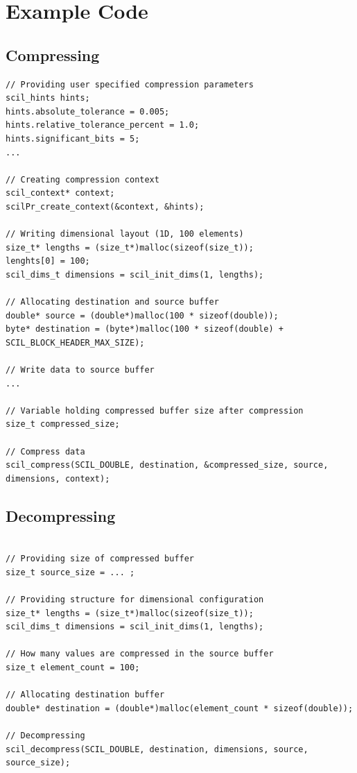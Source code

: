 \documentclass[
	12pt,
	a4paper,
	BCOR10mm,
	DIV14,
	headsepline,
]{scrreprt}
\begin{document}
\setcounter{footnote}{0}

\chapter{Example Code}


\section{Compressing}

\bigskip

\begin{lstlisting}[caption=Compression with SCIL, label={lst:comp}]
// Providing user specified compression parameters
scil_hints hints;
hints.absolute_tolerance = 0.005;
hints.relative_tolerance_percent = 1.0;
hints.significant_bits = 5;
...

// Creating compression context
scil_context* context;
scilPr_create_context(&context, &hints);

// Writing dimensional layout (1D, 100 elements)
size_t* lengths = (size_t*)malloc(sizeof(size_t));
lenghts[0] = 100;
scil_dims_t dimensions = scil_init_dims(1, lengths);

// Allocating destination and source buffer
double* source = (double*)malloc(100 * sizeof(double));
byte* destination = (byte*)malloc(100 * sizeof(double) + SCIL_BLOCK_HEADER_MAX_SIZE);

// Write data to source buffer
...

// Variable holding compressed buffer size after compression
size_t compressed_size;

// Compress data
scil_compress(SCIL_DOUBLE, destination, &compressed_size, source, dimensions, context);
\end{lstlisting}

\clearpage

\section{Decompressing}

\bigskip

\begin{lstlisting}[caption=Decompression with SCIL, label={lst:decomp}]

// Providing size of compressed buffer
size_t source_size = ... ;

// Providing structure for dimensional configuration
size_t* lengths = (size_t*)malloc(sizeof(size_t));
scil_dims_t dimensions = scil_init_dims(1, lengths);

// How many values are compressed in the source buffer
size_t element_count = 100;

// Allocating destination buffer
double* destination = (double*)malloc(element_count * sizeof(double));

// Decompressing
scil_decompress(SCIL_DOUBLE, destination, dimensions, source, source_size);
\end{lstlisting}
\end{document}
